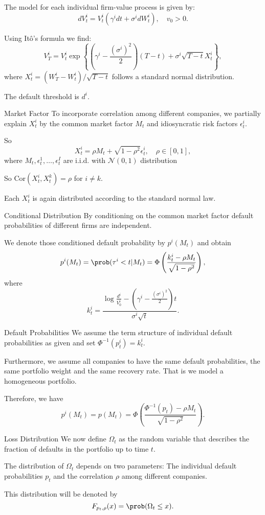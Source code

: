 	The model for each individual firm-value process is given by:
    $$dV_t^i=V_t^i(\gamma^i dt+\sigma^idW^i_t),\quad v_0>0.$$
	
	Using It\^{o}'s formula we find:
    $$V_T^i=V_t^i\exp\left\{\left(\gamma^i-\frac{(\sigma^i)^2}{2}\right)(T-t)+\sigma^i\sqrt{T-t}X_{t}^i\right\},$$
	where $X_{t}^i=(W^i_T-W^i_t)/\sqrt{T-t}$ follows a standard normal distribution.
  
	The default threshold is $d^i$.


Market Factor
	To incorporate correlation among different companies, we
	partially explain $X_{t}^i$ by the common market factor $M_t$
	and idiosyncratic risk factors $\epsilon_t^i$.
 
	So $$X_t^i=\rho M_t+\sqrt{1-\rho^2}\epsilon^i_t,\quad \rho\in[0,1],$$
  where $M_t, \epsilon_t^1,\dots,\epsilon_t^I$ are i.i.d. with $\mathcal{N}(0,1)$ distribution
	
	So $\mbox{Cor}(X^i_t,X^k_t)=\rho$ for $i\neq k$.
	
	Each $X_t^i$ is again distributed according to the standard normal law.


Conditional Distribution
	By conditioning on the common market factor default probabilities of different firms are independent.  
	
	We denote those conditioned default probability by $p^i(M_t)$ and obtain
    $$p^i(M_t)=\prob(\tau^i<t|M_t)=\Phi\left(\frac{k^i_t-\rho M_t}{\sqrt{1-\rho^2}}\right),$$
  where
    $$k^i_t=\frac{\log{\frac{d^i}{V_0^i}}-\left(\gamma^i-\frac{(\sigma^i)^2}{2}\right)t}{\sigma^i\sqrt{t}}.$$


Default Probabilities
	We assume the term structure of individual default
	probabilities as given and set $\Phi^{-1}(p^i_t)=k^i_t$. 

	Furthermore, we assume all companies to have the same default
	probabilities, the same portfolio weight and the same recovery 
	rate. That is we model a homogeneous portfolio.
 
	Therefore, we have
    $$p^i(M_t)=p(M_t)=\Phi\left(\frac{\Phi^{-1}(p_t)-\rho M_t}{\sqrt{1-\rho^2}}\right).$$


Loss Distribution
	We now define $\Omega_t$ as the random variable that
	describes the fraction of defaults in the portfolio
	up to time $t$.
	
	The distribution of $\Omega_t$ depends on two
	parameters: The individual default probabilities $p_t$
	and the correlation $\rho$ among different companies.
	
	This distribution will be denoted by
    $$F_{p_t,\rho}(x)=\prob(\Omega_t\leq x).$$


